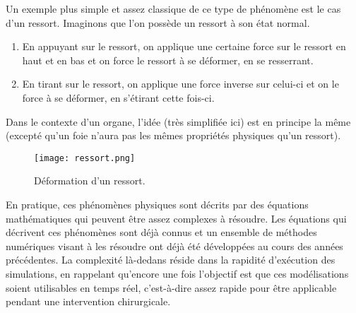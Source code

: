 \begin{minipage}{0.58\linewidth}
	Un exemple plus simple et assez classique de ce type de phénomène est le cas d’un ressort. Imaginons que l’on possède un ressort à son état normal.
	\begin{enumerate}[label=\textbullet]
		\item En appuyant sur le ressort, on applique une certaine force sur le ressort en haut et en bas et on force le ressort à se déformer, en se resserrant.
		\item En tirant sur le ressort, on applique une force inverse sur celui-ci et on le force à se déformer, en s’étirant cette fois-ci.
	\end{enumerate}
	Dans le contexte d'un organe, l’idée (très simplifiée ici) est en principe la même (excepté qu’un foie n’aura pas les mêmes propriétés physiques qu’un ressort).
\end{minipage}
\begin{minipage}{0.38\linewidth}
	\begin{figure}[H]
		\centering
		\texttt{[image: ressort.png]}
		\caption{Déformation d'un ressort.}
	\end{figure}
\end{minipage}

En pratique, ces phénomènes physiques sont décrits par des équations mathématiques qui peuvent être assez complexes à résoudre. Les équations qui décrivent ces phénomènes sont déjà connus et un ensemble de méthodes numériques visant à les résoudre ont déjà été développées au cours des années précédentes. La complexité là-dedans réside dans la rapidité d’exécution des simulations, en rappelant qu’encore une fois l’objectif est que ces modélisations soient utilisables en temps réel, c’est-à-dire assez rapide pour être applicable pendant une intervention chirurgicale.
